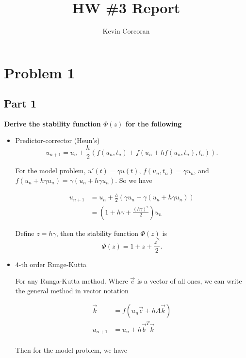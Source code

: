 \documentclass[12pt,a4paper]{article}
\title{ HW \#3 Report}
\author{ Kevin Corcoran }
\begin{document}
\maketitle

\section{Problem 1}%
\label{sec:problem_1}

\subsection{Part 1}%
\label{sub:part_1}

\par \textbf{Derive the stability function $\Phi (z)$ for the following} 


\begin{itemize}
  \item Predictor-corrector (Heun's)
    \[
      u_{n+1} = u_n + \frac{h}{2} \left(f(u_n,t_n) + f(u_n+hf(u_n,t_n),t_n)\right)
    .\] 

    \par For the model problem, $u'(t) = \gamma u(t)$, $f(u_n,t_n) = \gamma
    u_n$, and $f(u_n + h\gamma u_n)=\gamma(u_n+h\gamma u_n)$. So we have

    \begin{align*}
      u_{n+1} &= u_n + \frac{h}{2} \left(\gamma u_n + \gamma (u_n + h\gamma
      u_n) \right) \\
              &= \left(1 + h\gamma + \frac{(h\gamma)^2}{2}\right) u_n
    \end{align*}

    \par Define $z = h\gamma$, then the stability function $\Phi (z)$ is
    \[
      \boxed{\Phi (z) = 1 + z + \frac{z^2}{2}}
    .\] 

  \item $4$-th order Runge-Kutta

    \par For any Runga-Kutta method. Where $\vec{e}$ is a vector of all
    ones, we can write the general method in vector notation

    \begin{align*}
      \vec{k} &= f(u_n \vec{e} + hA\vec{k}) \\
      u_{n+1} &= u_{n} + h\vec{b}^T\vec{k} \\
    \end{align*}

    \par Then for the model problem, we have
    

\end{itemize}
\end{document}
